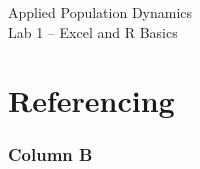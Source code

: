 \documentclass[color=usenames,dvipsnames]{beamer}\usepackage[]{graphicx}\usepackage[]{xcolor}
\begin{document}
\begin{frame}[plain]
  \huge
  \begin{center}
    \huge Applied Population Dynamics \\
    \LARGE Lab 1 -- Excel and R Basics \\
    \vspace{.5cm}
  \end{center}
\end{frame}


\section{Referencing}


\begin{frame}
  \frametitle{Column B}
\end{frame}
\end{document}
